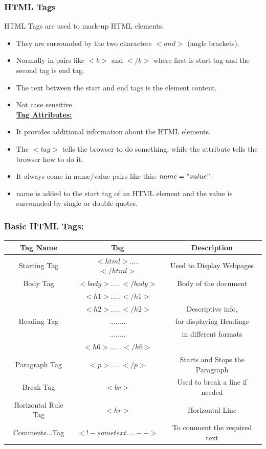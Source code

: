 \documentclass[11pt,a4paper]{article}
\begin{document}
\subsubsection*{HTML Tags}
 HTML Tags are used to mark-up HTML elements.
\begin{itemize}
\item They are surrounded by the two characters $< and >$ (angle brackets).
\item Normally in pairs like $<b>$ and $</b>$ where first is start tag and the second tag is end tag.
\item The text between the start and end tags is the element content.
\item Not case sensitive\\

\underline{\textbf{Tag Attributes:}}

\item It provides additional information about the HTML elements.
\item The $<tag>$ tells the browser to do something, while the attribute tells the browser how to do it.
\item It always come in name/value pairs like this: $name="value".$
\item name is added to the start tag of an HTML element and the value is surrounded by  single or double quotes.\\
\end{itemize}

\subsubsection*{Basic HTML Tags:}
\begin{tabular}{| c | c | c |}\hline
\textbf{Tag Name} & \textbf{Tag} & \textbf{Description} \\\hline
 Starting Tag & $<html>$.....$</html>$ & Used to Display Webpages\\ \hline
 Body Tag & $<body>$.....$</body>$ & Body of the document\\ \hline
 & $<h1>$.....$</h1>$ & \\ 
 & $<h2>$.....$</h2>$ & Descriptive info, \\
 Heading Tag & ........  & for displaying Headings \\ 
 & ........  & in different formats \\
 &  $<h6>$......$</h6>$ &  \\ \hline
 Paragraph Tag & $<p>$.....$</p>$ & Starts and Stops the Paragraph\\ \hline
 Break Tag & $<br>$ & Used to break a line if needed\\ \hline
 Horizontal Rule Tag & $<hr>$ & Horizontal Line\\ \hline
 Comments...Tag & $<!- some text.... -->$ & To comment the required text \\ \hline
\end{tabular}
\\
\end{document}
